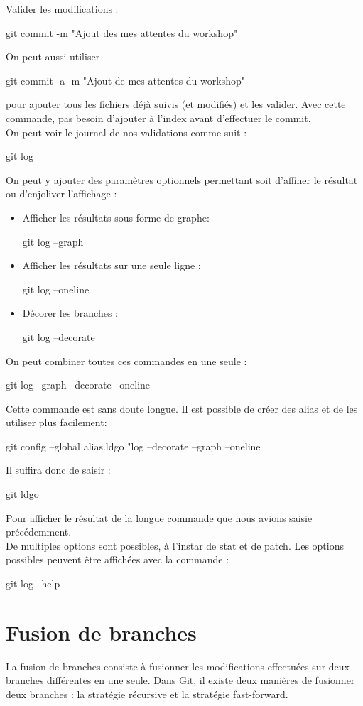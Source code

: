 \documentclass[11pt, a4paper]{book}
\begin{document}
Valider les modifications :
\begin{bash}
git commit -m "Ajout des mes attentes du workshop"
\end{bash}
On  peut aussi utiliser 
\begin{bash}
git commit -a -m "Ajout de mes attentes du workshop"
\end{bash}
pour ajouter tous les fichiers déjà suivis (et modifiés) et les valider. Avec cette commande, pas besoin d'ajouter à l'index avant d'effectuer le commit.\\
On peut voir le journal de nos validations comme suit :
\begin{bash}
git log
\end{bash}
On peut y ajouter des paramètres optionnels permettant soit d'affiner le résultat ou d'enjoliver l'affichage :
\begin{itemize}
\item Afficher les résultats sous forme de graphe:
\begin{bash}
git log --graph
\end{bash}
\item Afficher les résultats sur une seule ligne :
\begin{bash}
git log --oneline
\end{bash}
\item Décorer les branches :
\begin{bash}
git log --decorate
\end{bash}
\end{itemize}
On peut combiner toutes ces commandes en une seule :
\begin{bash}
git log --graph --decorate --oneline
\end{bash}
Cette commande est sans doute longue. Il est possible de créer des alias et de les utiliser plus facilement:
\begin{bash}
git config --global alias.ldgo "log --decorate --graph --oneline
\end{bash}
Il suffira donc de saisir :
\begin{bash}
git ldgo
\end{bash}
Pour afficher le résultat de la longue commande que nous avions saisie précédemment.\\
De multiples options sont possibles, à l'instar de stat et de patch. Les options possibles peuvent être affichées avec la commande :
\begin{bash}
git log --help
\end{bash}
\section{Fusion de branches}
La fusion de branches consiste à fusionner les modifications effectuées sur deux branches différentes en une seule. Dans Git, il existe deux manières de fusionner deux branches : la stratégie récursive et la stratégie fast-forward.
\end{document}
